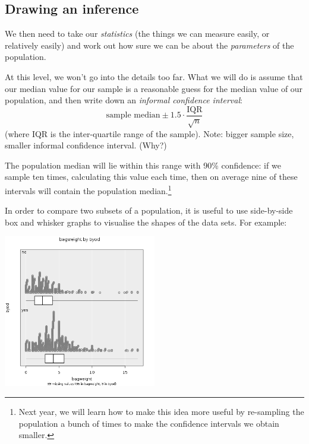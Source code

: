 \subsection*{Drawing an inference}
We then need to take our \emph{statistics} (the things we can measure easily, or relatively easily) and work out how sure we can be about the
\emph{parameters} of the population.

At this level, we won't go into the details too far. What we will do is assume that our
median value for our sample is a reasonable guess for the median value of our population,
and then write down an \emph{informal confidence interval}:
\begin{displaymath}
  \text{sample median} \pm 1.5 \cdot \frac{\text{IQR}}{\sqrt{n}}
\end{displaymath}
(where IQR is the inter-quartile range of the sample). Note: bigger sample size,
smaller informal confidence interval. (Why?)

The population median will lie within this range with 90\% confidence: if
we sample ten times, calculating this value each time, then on average nine of
these intervals will contain the population median.\footnote{Next year, we will
learn how to make this idea more useful by re-sampling the population a bunch of
times to make the confidence intervals we obtain smaller.}

In order to compare two subsets of a population, it is useful to use side-by-side
box and whisker graphs to visualise the shapes of the data sets. For example:
\begin{center}
  \includegraphics[width=0.5\textwidth]{stats-byod}
\end{center}


\clearpage
